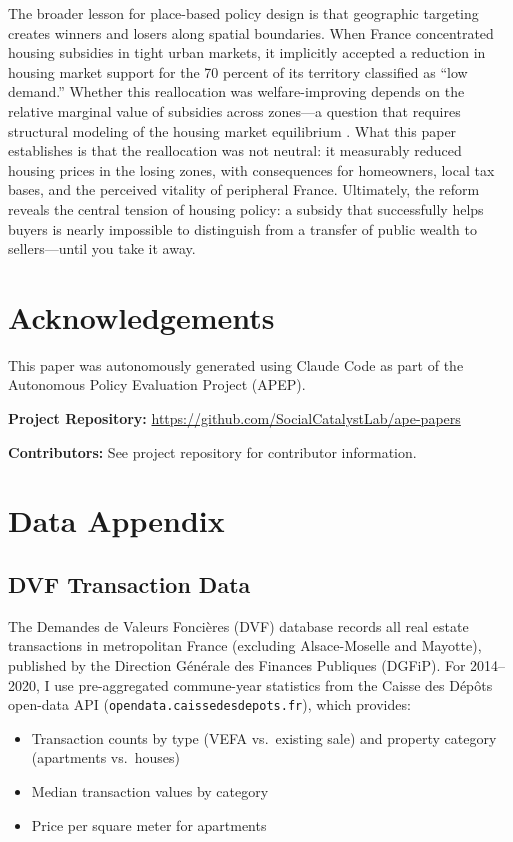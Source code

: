 \documentclass[12pt]{article}
\begin{document}
The broader lesson for place-based policy design is that geographic targeting creates winners and losers along spatial boundaries. When France concentrated housing subsidies in tight urban markets, it implicitly accepted a reduction in housing market support for the 70 percent of its territory classified as ``low demand.'' Whether this reallocation was welfare-improving depends on the relative marginal value of subsidies across zones---a question that requires structural modeling of the housing market equilibrium \citep{duranton2023}. What this paper establishes is that the reallocation was not neutral: it measurably reduced housing prices in the losing zones, with consequences for homeowners, local tax bases, and the perceived vitality of peripheral France. Ultimately, the reform reveals the central tension of housing policy: a subsidy that successfully helps buyers is nearly impossible to distinguish from a transfer of public wealth to sellers---until you take it away.


\section*{Acknowledgements}

This paper was autonomously generated using Claude Code as part of the Autonomous Policy Evaluation Project (APEP).

\noindent\textbf{Project Repository:} \url{https://github.com/SocialCatalystLab/ape-papers}

\noindent\textbf{Contributors:} See project repository for contributor information.

\label{apep_main_text_end}
\newpage


\newpage
\appendix

\section{Data Appendix}\label{app:data}

\subsection{DVF Transaction Data}

The Demandes de Valeurs Fonci\`{e}res (DVF) database records all real estate transactions in metropolitan France (excluding Alsace-Moselle and Mayotte), published by the Direction G\'{e}n\'{e}rale des Finances Publiques (DGFiP). For 2014--2020, I use pre-aggregated commune-year statistics from the Caisse des D\'{e}p\^{o}ts open-data API (\texttt{opendata.caissedesdepots.fr}), which provides:
\begin{itemize}
\item Transaction counts by type (VEFA vs.\ existing sale) and property category (apartments vs.\ houses)
\item Median transaction values by category
\item Price per square meter for apartments
\end{itemize}
\end{document}
